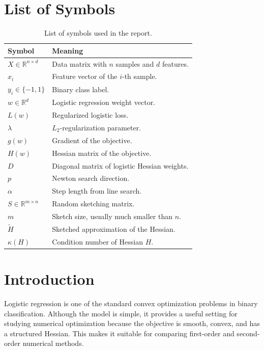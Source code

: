 \documentclass[12pt,a4paper]{report}
\begin{document}
\tableofcontents
\listoffigures
\listoftables

\chapter*{List of Symbols}

\begin{table}[H]
\centering
\caption{List of symbols used in the report.}
\label{tab:symbols}
\begin{tabular}{>{\raggedright\arraybackslash}p{}p{}}
\toprule
Symbol & Meaning \\
\midrule
\(X\in\mathbb{R}^{n\times d}\) & Data matrix with \(n\) samples and \(d\) features. \\
\(x_i\) & Feature vector of the \(i\)-th sample. \\
\(y_i\in\{-1,1\}\) & Binary class label. \\
\(w\in\mathbb{R}^d\) & Logistic regression weight vector. \\
\(L(w)\) & Regularized logistic loss. \\
\(\lambda\) & \(L_2\)-regularization parameter. \\
\(g(w)\) & Gradient of the objective. \\
\(H(w)\) & Hessian matrix of the objective. \\
\(D\) & Diagonal matrix of logistic Hessian weights. \\
\(p\) & Newton search direction. \\
\(\alpha\) & Step length from line search. \\
\(S\in\mathbb{R}^{m\times n}\) & Random sketching matrix. \\
\(m\) & Sketch size, usually much smaller than \(n\). \\
\(\tilde H\) & Sketched approximation of the Hessian. \\
\(\kappa(H)\) & Condition number of Hessian \(H\). \\
\bottomrule
\end{tabular}
\end{table}

\clearpage
{}

\chapter{Introduction}

Logistic regression is one of the standard convex optimization problems in binary classification. Although the model is simple, it provides a useful setting for studying numerical optimization because the objective is smooth, convex, and has a structured Hessian. This makes it suitable for comparing first-order and second-order numerical methods.
\end{document}
